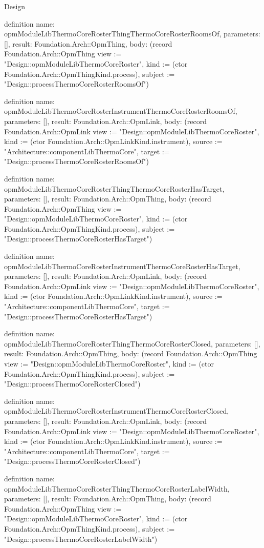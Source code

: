 \begin{lexlean}{Design}
\begin{semanticmodule}
definition{
  name: opmModuleLibThermoCoreRosterThingThermoCoreRosterRoomsOf,
  parameters: [],
  result: Foundation.Arch::OpmThing,
  body: (record Foundation.Arch::OpmThing {view := "Design::opmModuleLibThermoCoreRoster", kind := (ctor Foundation.Arch::OpmThingKind.process), subject := "Design::processThermoCoreRosterRoomsOf"})
}

definition{
  name: opmModuleLibThermoCoreRosterInstrumentThermoCoreRosterRoomsOf,
  parameters: [],
  result: Foundation.Arch::OpmLink,
  body: (record Foundation.Arch::OpmLink {view := "Design::opmModuleLibThermoCoreRoster", kind := (ctor Foundation.Arch::OpmLinkKind.instrument), source := "Architecture::componentLibThermoCore", target := "Design::processThermoCoreRosterRoomsOf"})
}

definition{
  name: opmModuleLibThermoCoreRosterThingThermoCoreRosterHasTarget,
  parameters: [],
  result: Foundation.Arch::OpmThing,
  body: (record Foundation.Arch::OpmThing {view := "Design::opmModuleLibThermoCoreRoster", kind := (ctor Foundation.Arch::OpmThingKind.process), subject := "Design::processThermoCoreRosterHasTarget"})
}

definition{
  name: opmModuleLibThermoCoreRosterInstrumentThermoCoreRosterHasTarget,
  parameters: [],
  result: Foundation.Arch::OpmLink,
  body: (record Foundation.Arch::OpmLink {view := "Design::opmModuleLibThermoCoreRoster", kind := (ctor Foundation.Arch::OpmLinkKind.instrument), source := "Architecture::componentLibThermoCore", target := "Design::processThermoCoreRosterHasTarget"})
}

definition{
  name: opmModuleLibThermoCoreRosterThingThermoCoreRosterClosed,
  parameters: [],
  result: Foundation.Arch::OpmThing,
  body: (record Foundation.Arch::OpmThing {view := "Design::opmModuleLibThermoCoreRoster", kind := (ctor Foundation.Arch::OpmThingKind.process), subject := "Design::processThermoCoreRosterClosed"})
}

definition{
  name: opmModuleLibThermoCoreRosterInstrumentThermoCoreRosterClosed,
  parameters: [],
  result: Foundation.Arch::OpmLink,
  body: (record Foundation.Arch::OpmLink {view := "Design::opmModuleLibThermoCoreRoster", kind := (ctor Foundation.Arch::OpmLinkKind.instrument), source := "Architecture::componentLibThermoCore", target := "Design::processThermoCoreRosterClosed"})
}

definition{
  name: opmModuleLibThermoCoreRosterThingThermoCoreRosterLabelWidth,
  parameters: [],
  result: Foundation.Arch::OpmThing,
  body: (record Foundation.Arch::OpmThing {view := "Design::opmModuleLibThermoCoreRoster", kind := (ctor Foundation.Arch::OpmThingKind.process), subject := "Design::processThermoCoreRosterLabelWidth"})
}


\end{semanticmodule}
\end{lexlean}
